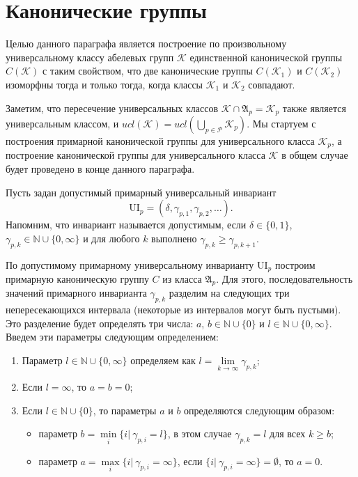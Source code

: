 \documentclass[a4paper,11pt,twoside]{article}
\def\A{{\mathfrak{A}}}
\def\K{{\mathcal{K}}}
\def\P{{\mathcal{P}}}
\def\N{{\mathbb{N}}}
\def\ui{{\mathrm{UI}}}
\begin{document}
\section{Канонические группы}\label{sec:CannonicalGroups}

Целью данного параграфа является построение по произвольному универсальному классу абелевых групп $\K$ единственной канонической группы $C(\K)$ с таким свойством, что две канонические группы $C(\K_1)$ и $C(\K_2)$ изоморфны тогда и только тогда, когда классы $\K_1$ и $\K_2$ совпадают.

Заметим, что пересечение универсальных классов $\K \cap \A_p = \K_p$ также является универсальным классом, и $ucl(\K) = ucl(\bigcup\limits_{p \in \P} \K_p)$. Мы стартуем с построения примарной канонической группы для универсального класса $\K_p$, а построение канонической группы для универсального класса $\K$ в общем случае будет проведено в конце данного параграфа.

Пусть задан допустимый примарный универсальный инвариант 
$$\ui_p = (\delta, \gamma_{p,1}, \gamma_{p,2}, \ldots).$$
Напомним, что инвариант называется допустимым, если $\delta \in \{0,1\}$, $\gamma_{p,k} \in \N \cup \{0, \infty\}$ и для любого $k$ выполнено $\gamma_{p,k} \geq \gamma_{p, k+1}$.

По допустимому примарному универсальному инварианту $\ui_p$ построим примарную каноническую группу $C$ из класса $\A_p$. Для этого, последовательность значений примарного инварианта $\gamma_{p,k}$ разделим на следующих три непересекающихся интервала (некоторые из интервалов могут быть пустыми). Это разделение будет определять три числа: $a$, $b \in \N \cup \{0\}$ и $l \in \N \cup \{0, \infty\}$. Введем эти параметры следующим определением:
\begin{enumerate}
\item Параметр $l \in \N \cup \{0, \infty\}$ определяем как $l = \lim\limits_{k \rightarrow \infty} \gamma_{p,k}$;
\item Если $l = \infty$, то $a = b = 0$;
\item Если $l \in \N \cup \{0\}$, то параметры $a$ и $b$ определяются следующим образом:
\begin{itemize}
\item параметр $b = \min\limits_{i} \{ i | \ \gamma_{p,i} = l\}$, в этом случае $\gamma_{p,k} = l$ для всех $k \geq b$;
\item параметр $a = \max\limits_{i} \{i | \ \gamma_{p,i} = \infty\}$, если $\{i | \ \gamma_{p,i} = \infty\} = \emptyset$, то $a = 0$.
\end{itemize}
\end{enumerate}
\end{document}
